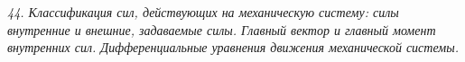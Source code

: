 \emph{44. Классификация сил, действующих на механическую систему: силы внутренние
и внешние, задаваемые силы. Главный вектор и главный момент внутренних сил.
Дифференциальные уравнения движения механической системы.}

\newpage
